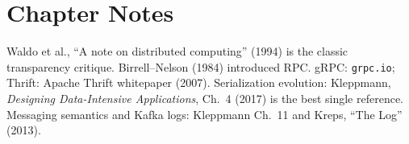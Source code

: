 \section*{Chapter Notes}
Waldo et al., ``A note on distributed computing'' (1994) is the classic transparency critique. Birrell--Nelson (1984) introduced RPC. gRPC: \texttt{grpc.io}; Thrift: Apache Thrift whitepaper (2007). Serialization evolution: Kleppmann, \emph{Designing Data-Intensive Applications}, Ch.~4 (2017) is the best single reference. Messaging semantics and Kafka logs: Kleppmann Ch.~11 and Kreps, ``The Log'' (2013).

